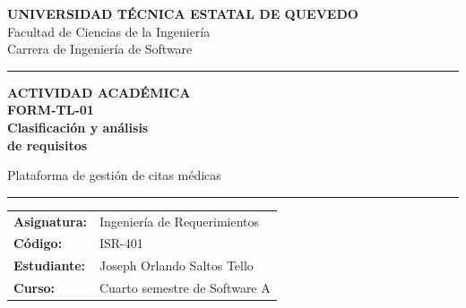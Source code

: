 \documentclass[12pt,a4paper]{article}
\renewcommand{\arraystretch}{1.35}
\begin{document}
\begin{titlepage}
    \centering

    {\large\textbf{UNIVERSIDAD TÉCNICA ESTATAL DE QUEVEDO}}\\[0.3cm]

    {\normalsize Facultad de Ciencias de la Ingeniería}\\[0.15cm]
    {\normalsize Carrera de Ingeniería de Software}

    \vspace{1.5cm}

    {\color{azulTabla}\rule{0.85\textwidth}{1.5pt}}

    \vspace{1.2cm}

    {\large\textcolor{azulTabla}{\textbf{ACTIVIDAD ACADÉMICA}}}\\[0.5cm]

    {\Large\textbf{FORM-TL-01}}\\[0.8cm]

    {\LARGE\bfseries
    Clasificación y análisis\\[0.2cm]
    de requisitos
    }

    \vspace{0.5cm}

    {\large Plataforma de gestión de citas médicas}

    \vspace{1.2cm}

    {\color{azulTabla}\rule{0.85\textwidth}{1.5pt}}

    \vspace{0.8cm}

    \begin{minipage}{0.78\textwidth}
        \renewcommand{\arraystretch}{1.8}
        \begin{tabular}{@{}>{\bfseries}p{3.5cm}p{8cm}@{}}
            Asignatura: & Ingeniería de Requerimientos \\

            Código: & ISR-401 \\

            Estudiante: & Joseph Orlando Saltos Tello \\

            Curso: & Cuarto semestre de Software A \\


\end{tabular}
\end{minipage}
\end{titlepage}
\end{document}
